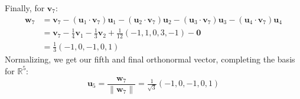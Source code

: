 \documentclass[12pt]{article}
\begin{document}
\begin{enumerate}
\begin{enumerate}
                    Finally, for \(\mathbf{v}_7\):
                    \begin{align*}
                        \mathbf{w}_7 & =\mathbf{v}_7-(\mathbf{u}_1\cdot\mathbf{v}_7)\mathbf{u}_1-(\mathbf{u}_2\cdot\mathbf{v}_7)\mathbf{u}_2-(\mathbf{u}_3\cdot\mathbf{v}_7)\mathbf{u}_3-(\mathbf{u}_4\cdot\mathbf{v}_7)\mathbf{u}_4 \\
                                     & =\mathbf{v}_7-\tfrac{1}{4}\mathbf{v}_1-\tfrac{1}{3}\mathbf{v}_2+\tfrac{1}{12} (-1,1,0,3,-1)-\mathbf{0}                                                                                        \\
                                     & =\tfrac{1}{3} (-1,0,-1,0,1)
                    \end{align*}
                    Normalizing, we get our fifth and final orthonormal vector, completing the basis for \(\mathbb{R}^5\):
                    \[
                        \mathbf{u}_5=\frac{                                                                                                                                                                                                                                                                                                                                                                                                                                                                                                                                                                                   \mathbf{w}_7}{\|\mathbf{w}_7\|} =\tfrac{1}{\sqrt{3}}(-1,0,-1,0,1)
                    \]


\end{enumerate}
\end{enumerate}
\end{document}
